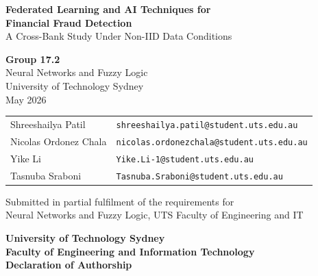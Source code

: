 \documentclass[12pt, a4paper]{article}
\begin{document}
\begin{titlepage}
\centering
\vspace*{2cm}

{\LARGE \textbf{Federated Learning and AI Techniques for\\[0.3em]
Financial Fraud Detection}}\\[0.8em]
{\large A Cross-Bank Study Under Non-IID Data Conditions}

\vspace{1.5cm}

{\large
\textbf{Group 17.2}\\[0.5em]
Neural Networks and Fuzzy Logic\\[0.3em]
University of Technology Sydney\\[0.3em]
May 2026
}

\vspace{2cm}

\begin{tabular}{ll}
Shreeshailya Patil         & \texttt{shreeshailya.patil@student.uts.edu.au}\\[0.4em]
Nicolas Ordonez Chala      & \texttt{nicolas.ordonezchala@student.uts.edu.au}\\[0.4em]
Yike Li                    & \texttt{Yike.Li-1@student.uts.edu.au}\\[0.4em]
Tasnuba Sraboni            & \texttt{Tasnuba.Sraboni@student.uts.edu.au}\\
\end{tabular}

\vfill

{\small Submitted in partial fulfilment of the requirements for\\
Neural Networks and Fuzzy Logic, UTS Faculty of Engineering and IT}
\end{titlepage}

\newpage
\thispagestyle{plain}

\begin{center}
{\large\bfseries University of Technology Sydney}\\[0.3em]
{\large\bfseries Faculty of Engineering and Information Technology}\\[1em]
{\large\bfseries Declaration of Authorship}
\end{center}

\vspace{1em}
\end{document}
